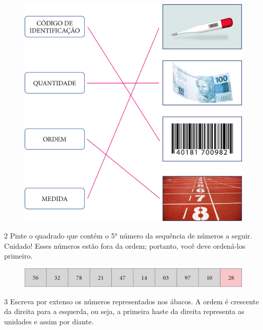 \begin{figure}[htpb!]
\includegraphics[width=\textwidth]{./media/image3.png}
\end{figure}


\num{2} Pinte o quadrado que contém o 5° número da sequência de números a seguir.
Cuidado! Esses números estão fora da ordem; portanto, você deve
ordená-los primeiro.\enlargethispage{2\baselineskip}

\begin{figure}[htpb!]
\includegraphics[width=\textwidth]{./media/image4.png}
\end{figure}


\num{3} Escreva por extenso os números representados nos ábacos. A ordem
é crescente da direita para a esquerda, ou seja, a primeira haste da
direita representa as unidades e assim por diante.

